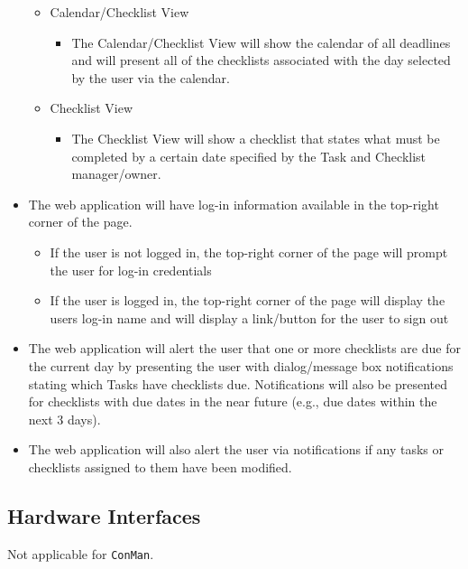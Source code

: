 \documentclass{article}
\begin{document}
\begin{itemize}
\begin{itemize}
		\item Calendar/Checklist View
		\begin{itemize}
			\item The Calendar/Checklist View will show the calendar of all deadlines and will present all of the checklists associated with the day selected by the user via the calendar.
		\end{itemize}
		
		\item Checklist View
		\begin{itemize}
			\item The Checklist View will show a checklist that states what must be completed by a certain date specified by the Task and Checklist manager/owner.
		\end{itemize}
		
	\end{itemize}
    

	\item The web application will have log-in information available in the top-right corner of the page.
		\begin{itemize}
			\item If the user is not logged in, the top-right corner of the page will prompt the user for log-in credentials
			\item If the user is logged in, the top-right corner of the page will display the users log-in name and will display a link/button for the user to sign out
		\end{itemize}
	\item The web application will alert the user that one or more checklists are due for the current day by presenting the user with dialog/message box notifications stating which Tasks have checklists due. Notifications
			will also be presented for checklists with due dates in the near future (e.g., due dates within the next 3 days).
	\item The web application will also alert the user via notifications if any tasks or checklists assigned to them have been modified.
\end{itemize}

\subsection{Hardware Interfaces}
Not applicable for \texttt{ConMan}.
\end{document}
